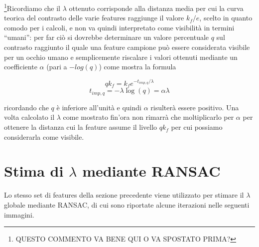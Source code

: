 \documentclass[12pt]{report}
\begin{document}
\noindent \footnote{\color{red} QUESTO COMMENTO VA BENE QUI O VA SPOSTATO PRIMA?}Ricordiamo che il $\lambda$ ottenuto corrisponde alla distanza media per cui la curva teorica del contrasto delle varie features raggiunge il valore $k_f/e$, scelto in quanto comodo per i calcoli, e non va quindi interpretato come visibilit\`a in termini ``umani'': per far ci\`o si dovrebbe determinare un valore percentuale $q$ sul contrasto raggiunto il quale una feature campione pu\`o essere considerata visibile per un occhio umano e semplicemente riscalare i valori ottenuti mediante un coefficiente $\alpha$ (pari a $-log\left(q\right)$) come mostra la formula

$$qk_f = k_fe^{-t_{imp,q}/\lambda}$$
$$t_{imp,q} = -\lambda\log \left(q\right) = \alpha\lambda$$

\noindent ricordando che $q$ \`e inferiore all'unit\`a e quindi $\alpha$ risulter\`a essere positivo. Una volta calcolato il $\lambda$ come mostrato fin'ora non rimarr\`a che moltiplicarlo per $\alpha$ per ottenere la distanza cui la feature assume il livello $qk_f$ per cui possiamo considerarla come visibile.\\


\newpage
\section{Stima di $\lambda$ mediante RANSAC}
\label{ransactest}

\noindent Lo stesso set di features della sezione precedente viene utilizzato per stimare il $\lambda$ globale mediante RANSAC, di cui sono riportate alcune iterazioni nelle seguenti immagini.
\end{document}
